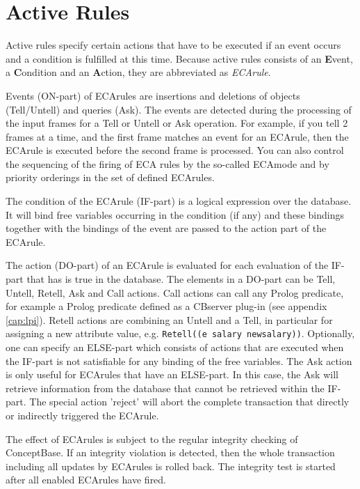 \chapter{Active Rules}
\label{sec:eca}


Active rules specify certain actions that have to
be executed if an event occurs and a condition is fulfilled at this time.
Because active rules consists of an {\bf E}vent, a {\bf C}ondition and an {\bf A}ction,
they are abbreviated as {\em ECArule}.

Events (ON-part) of ECArules are insertions and deletions of objects (Tell/Untell) and
queries (Ask).
The events are detected during the processing
of the input frames for a Tell or Untell or Ask operation. 
For example, if you tell 2 frames at a time,
and the first frame matches an event for an ECArule, then the
ECArule is executed before the second frame is processed. You can also control the
sequencing of the firing of ECA rules by the so-called ECAmode and by priority
orderings in the set of defined ECArules.

The condition of the ECArule (IF-part) is a logical expression over the 
database. It will bind free variables occurring in the condition (if any)
and these bindings together with the bindings of the event are passed to the action
part of the ECArule.

The action (DO-part) of an ECArule is evaluated for each evaluation of the IF-part 
that has is true in the database. The elements in a DO-part can be Tell, Untell, Retell, Ask 
and Call actions. Call actions can call any Prolog predicate, for example a Prolog predicate
defined as a CBserver plug-in (see appendix \ref{cap:lpi}). 
Retell actions are combining an Untell and a Tell, in particular for
assigning a new attribute value, e.g. {\tt Retell((e salary newsalary))}.
Optionally, one can specify an ELSE-part which consists of actions that are executed when
the IF-part is not satisfiable for any binding of the free variables. 
The Ask action is only useful for ECArules that have an ELSE-part. In this case, the Ask
will retrieve information from the database that cannot be retrieved within the IF-part.
The special action 'reject' will abort the complete transaction that directly or indirectly triggered
the ECArule.

The effect of ECArules is subject to the regular integrity checking of ConceptBase.
If an integrity violation is detected, then the whole transaction including all
updates by ECArules is rolled back. The integrity test is started after all enabled
ECArules have fired.


